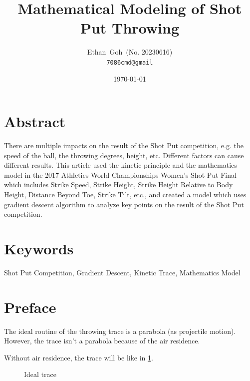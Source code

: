 \documentclass{article}
\title{Mathematical Modeling of Shot Put Throwing}
\author{Ethan\ Goh\ (No. 20230616)\\\texttt{7086cmd@gmail}}
\date{\today}
\begin{document}
\maketitle
\section*{Abstract}
There are multiple impacts on the result of the Shot Put competition, e.g. the speed of the ball, the throwing degrees, height, etc. Different factors can cause different results. This article used the kinetic principle and the mathematics model in the 2017 Athletics World Championships Women's Shot Put Final which includes Strike Speed, Strike Height, Strike Height Relative to Body Height, Distance Beyond Toe, Strike Tilt, etc., and created a model which uses gradient descent algorithm to analyze key points on the result of the Shot Put competition.

\section*{Keywords} Shot Put Competition, Gradient Descent, Kinetic Trace, Mathematics Model

\newpage

\tableofcontents

\newpage

\section{Preface}

\label{section:preface}

The ideal routine of the throwing trace is a parabola (as projectile motion). However, the trace isn't a parabola because of the air residence.

Without air residence, the trace will be like in \ref{fig:ideal-trace}.

\begin{figure}[H]
    \centering
    \caption{Ideal trace}
    \label{fig:ideal-trace}
\end{figure}
\end{document}
